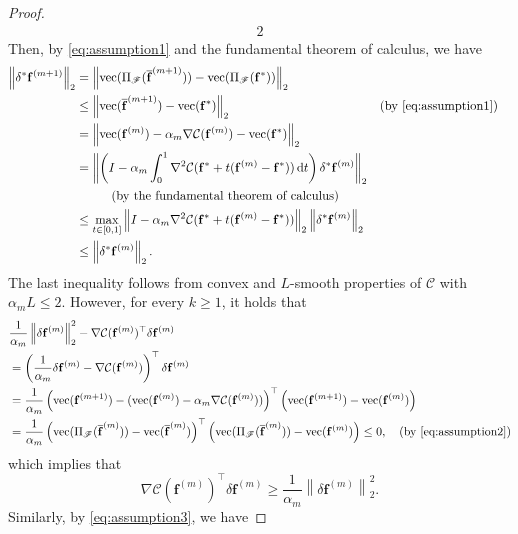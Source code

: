 \documentclass[onefignum,onetabnum]{siamonline220329}
\numberwithin{equation}{section}
\def\vec{{\mathrm{vec}}}
\def\f{\mathbf{f}}
\begin{document}
\begin{sloppypar}
\begin{proof}
\begin{alignat*}{2}
\end{alignat*}
Then, by \eqref{eq:assumption1} and the fundamental theorem of calculus, we have
\begin{align}
\left\| \delta^*\f^{(m+1)} \right\|_2 
&= \left\| \vec( \Pi_\mathscr{F}(\overline{\f}^{(m+1)}) ) - \vec( \Pi_{\mathscr{F}}(\f^{*}) ) \right\|_2 \nonumber \\
&\leq \left\|\vec( \overline{\f}^{(m+1)} ) - \vec( \f^{*} )\right\|_2 && \text{(by \eqref{eq:assumption1})} \nonumber \\
&= \left\|\vec(\f^{(m)}) - \alpha_m \nabla\mathcal{C}(\f^{(m)}) - \vec(\f^{*})\right\|_2 \nonumber \\
&= \left\|\left( I-\alpha_m \int_0^1 \nabla^2\mathcal{C}(\f^{*} + t(\f^{(m)} - \f^{*}))\,\mathrm{d}t \right) \delta^*\f^{(m)}\right\|_2 \nonumber\\
&\hspace{10mm} \text{(by the fundamental theorem of calculus)} \nonumber \\
& \leq \max_{t\in[0,1]} \left\| I-\alpha_m \nabla^2\mathcal{C}(\f^{*} + t(\f^{(m)} - \f^{*})) \right\|_2 \left\| \delta^*\f^{(m)} \right\|_2 \nonumber \\
& \leq \left\| \delta^*\f^{(m)} \right\|_2. \label{eq:d}
\end{align}
The last inequality follows from convex and $L$-smooth properties of $\mathcal{C}$ with $\alpha_m L \leq 2$.
However, for every $k\geq 1$, it holds that
\begin{align*}
& \frac{1}{\alpha_m} \left\| \delta\f^{(m)} \right\|_2^2 - \nabla\mathcal{C}(\f^{(m)})^\top \delta\f^{(m)}\\
&= \left( \frac{1}{\alpha_m}\delta\f^{(m)} - \nabla\mathcal{C}(\f^{(m)})\right)^\top \delta\f^{(m)} \\
&= \frac{1}{\alpha_m}\left( \vec(\f^{(m+1)}) - (\vec(\f^{(m)}) -\alpha_m\nabla\mathcal{C}(\f^{(m)}) ) \right)^\top \left( \vec(\f^{(m+1)}) - \vec(\f^{(m)}) \right) \\
&= \frac{1}{\alpha_m}\left( \vec( \Pi_\mathscr{F}(\overline{\f}^{(m)}) ) - \vec(\overline{\f}^{(m)}) \right)^\top \left( \vec( \Pi_\mathscr{F}(\overline{\f}^{(m)}) ) - \vec(\f^{(m)}) \right) \leq 0, \quad \text{(by \eqref{eq:assumption2})}
\end{align*}
which implies that
\begin{equation} \label{eq:result2}
\nabla\mathcal{C}(\f^{(m)})^\top \delta\f^{(m)} \geq \frac{1}{\alpha_m} \left\| \delta\f^{(m)} \right\|_2^2.
\end{equation}
Similarly, by \eqref{eq:assumption3}, we have

\end{proof}
\end{sloppypar}
\end{document}
